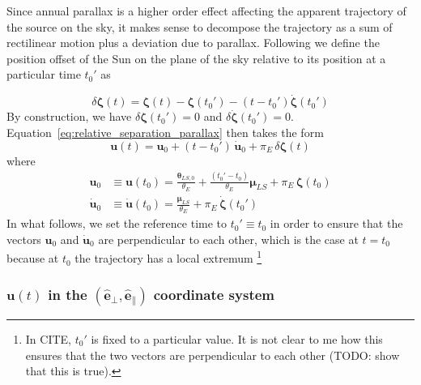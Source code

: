 \documentclass[12pt]{report}
\begin{document}
Since annual parallax is a higher order effect affecting the apparent
trajectory of the source on the sky, it makes sense to decompose the trajectory
as a sum of rectilinear motion plus a deviation due to parallax. Following
\citet{2004ApJ...606..319G} we define the position offset of the Sun on the
plane of the sky relative to its position at a particular time $t_0'$ as

\begin{equation}
    \delta\boldsymbol \zeta (t)=\boldsymbol \zeta (t)-\boldsymbol \zeta (t_0')-(t-t_0')
    \boldsymbol{\dot \zeta} (t_0')
\end{equation}
By construction, we have $\delta\boldsymbol \zeta (t_0')=0$ and
$\delta\dot{\boldsymbol \zeta} (t_0')=0$.
Equation~\ref{eq:relative_separation_parallax} then takes the form
\begin{equation}
    \boldsymbol{u}(t)=\mathbf{u}_0 + (t-t_0')\,\dot{\mathbf{u}}_0 +
    \pi_E\,\delta\boldsymbol \zeta(t)
    \label{eq:relative_separation_parallax_decomposed}
\end{equation}
where
\begin{align}
    \mathbf{u}_0       & \equiv \mathbf{u}(t_0) =\frac{\boldsymbol\theta_{LS, 0}}{\theta_E}
    + \frac{(t_0'-t_0)}{\theta_E}\boldsymbol\mu_{LS}+
    \pi_E\,\boldsymbol \zeta(t_0)                                                           \\
    \dot{\mathbf{u}}_0 & \equiv\dot{\mathbf{u}}(t_0)=
    \frac{\boldsymbol\mu_{LS}}{\theta_E}  + \pi_E\,\dot{\boldsymbol \zeta}
    (t_0')
\end{align}
In what follows, we set the reference time to $t_0'\equiv t_0$ in order to ensure that
the vectors $\mathbf{u}_0$ and $\dot{\mathbf{u}}_0$ are perpendicular to each other,
which is the case at $t=t_0$ because at $t_0$ the trajectory has a local extremum
\footnote{In CITE, $t_0'$ is fixed to a particular value. It is not clear
    to me how this ensures that the two vectors are perpendicular to each other
    (TODO: show that this is true).}

\subsubsection{$\mathbf{u}(t)$ in the $(\mathbf{\hat e}_\bot,
        \mathbf{\hat e}_\parallel)$ coordinate system}%
\end{document}
